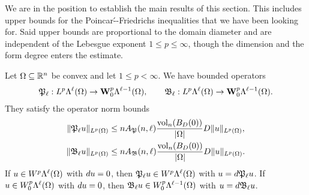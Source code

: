 \documentclass[10pt,letterpaper]{article}
\begin{document}
We are in the position to establish the main results of this section.
This includes upper bounds for the Poincar\'--Friedrichs inequalities that we have been looking for. 
Said upper bounds are proportional to the domain diameter and are independent of the Lebesgue exponent $1 \leq p \leq \infty$,
though the dimension and the form degree enters the estimate. 

\begin{theorem}
    Let $\Omega \subseteq {\mathbb R}^{n}$ be convex and let $1 \leq p < \infty$. 
    We have bounded operators 
    \begin{align*}
        {\mathfrak P}_{\ell} : L^{p}\Lambda^{\ell}(\Omega) \rightarrow {\mathbf W}^{p}_{0}\Lambda^{\ell-1}(\Omega)
        ,
        \qquad 
        {\mathfrak B}_{\ell} : L^{p}\Lambda^{\ell}(\Omega) \rightarrow {\mathbf W}^{p}_{0}\Lambda^{\ell-1}(\Omega)
        .
    \end{align*}
    They satisfy the operator norm bounds 
    \begin{align*}
        \| {\mathfrak P}_{\ell} u \|_{L^{p}(\Omega)}
        &\leq 
        n A_{{\mathfrak P}}(n,\ell) \frac{ \operatorname{vol}_{n}(B_D(0)) }{|\Omega|} 
        D
        \| u \|_{L^{p}(\Omega)}
        ,
        \\
        \| {\mathfrak B}_{\ell} u \|_{L^{p}(\Omega)}
        &\leq 
        n A_{{\mathfrak B}}(n,\ell) \frac{ \operatorname{vol}_{n}(B_D(0)) }{|\Omega|} 
        D
        \| u \|_{L^{p}(\Omega)}
        .
    \end{align*}
    If $u \in W^{p}    \Lambda^{\ell}(\Omega)$ with $d u = 0$, then ${\mathfrak P}_{\ell} u \in W^{p}    \Lambda^{\ell  }(\Omega)$ with $u = d {\mathfrak P}_{\ell} u$.
    If $u \in W^{p}_{0}\Lambda^{\ell}(\Omega)$ with $d u = 0$, then ${\mathfrak B}_{\ell} u \in W^{p}_{0}\Lambda^{\ell-1}(\Omega)$ with $u = d {\mathfrak B}_{\ell} u$.
\end{theorem}
\end{document}
